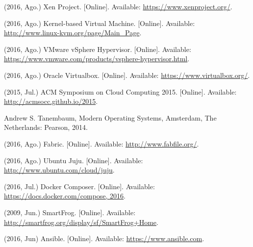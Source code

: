 \documentclass[conference, spanish]{IEEEtran}
\begin{document}

%
%
\begin{thebibliography}{1}




 (2016, Ago.) Xen Project. [Online]. Available: \url{https://www.xenproject.org/}.

 (2016, Ago.) Kernel-based Virtual Machine. [Online]. Available: \url{http://www.linux-kvm.org/page/Main_Page}.

 (2016, Ago.) VMware vSphere Hypervisor. [Online]. Available: \url{https://www.vmware.com/products/vsphere-hypervisor.html}.

 (2016, Ago.) Oracle Virtualbox. [Online]. Available: \url{https://www.virtualbox.org/}.

 (2015, Jul.) ACM Symposium on Cloud Computing 2015. [Online]. Available: \url{http://acmsocc.github.io/2015}.

 Andrew S. Tanembaum, Modern Operating Systems, Amsterdam, The Netherlands: Pearson, 2014.

 (2016, Ago.) Fabric. [Online]. Available: \url{http://www.fabfile.org/}.

 (2016, Ago.) Ubuntu Juju. [Online]. Available: \url{http://www.ubuntu.com/cloud/juju}.

 (2016, Jul.) Docker Composer. [Online]. Available: \url{https://docs.docker.com/compose, 2016}.

 (2009, Jun.) SmartFrog. [Online]. Available: \url{http://smartfrog.org/display/sf/SmartFrog+Home}.

 (2016, Jun) Ansible. [Online]. Available: \url{https://www.ansible.com}.


\end{thebibliography}
\end{document}

